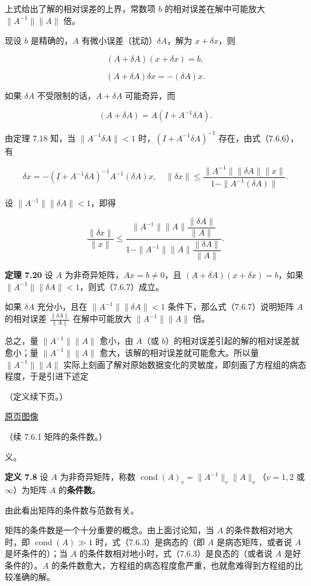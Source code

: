 \documentclass[
  10pt,
  fontset=fandol]{ctexart}
\begin{document}
上式给出了解的相对误差的上界，常数项 \(b\) 的相对误差在解中可能放大 \(\|A^{-1}\|\|A\|\) 倍。

现设 \(b\) 是精确的，\(A\) 有微小误差（扰动）\(\delta A\)，解为 \(x+\delta x\)，则

\[
(A+\delta A)(x+\delta x)=b,
\]

\[
(A+\delta A)\delta x=-(\delta A)x.
\tag{7.6.6}
\]

如果 \(\delta A\) 不受限制的话，\(A+\delta A\) 可能奇异，而

\[
(A+\delta A)=A(I+A^{-1}\delta A).
\]

由定理 7.18 知，当 \(\|A^{-1}\delta A\|<1\) 时，\((I+A^{-1}\delta A)^{-1}\) 存在，由式（7.6.6），有

\[
\delta x=-(I+A^{-1}\delta A)^{-1}A^{-1}(\delta A)x,\quad
\|\delta x\|\leqslant\frac{\|A^{-1}\|\|\delta A\|\|x\|}{1-\|A^{-1}(\delta A)\|}.
\]

设 \(\|A^{-1}\|\|\delta A\|<1\)，即得

\[
\frac{\|\delta x\|}{\|x\|}
\leqslant
\frac{\|A^{-1}\|\|A\|\dfrac{\|\delta A\|}{\|A\|}}
{1-\|A^{-1}\|\|A\|\dfrac{\|\delta A\|}{\|A\|}}.
\tag{7.6.7}
\]

\textbf{定理 7.20} 设 \(A\) 为非奇异矩阵，\(Ax=b\neq0\)，且 \((A+\delta A)(x+\delta x)=b\)，如果 \(\|A^{-1}\|\|\delta A\|<1\)，则式（7.6.7）成立。

如果 \(\delta A\) 充分小，且在 \(\|A^{-1}\|\|\delta A\|<1\) 条件下，那么式（7.6.7）说明矩阵 \(A\) 的相对误差 \(\frac{\|\delta A\|}{\|A\|}\) 在解中可能放大 \(\|A^{-1}\|\|A\|\) 倍。

总之，量 \(\|A^{-1}\|\|A\|\) 愈小，由 \(A\)（或 \(b\)）的相对误差引起的解的相对误差就愈小；量 \(\|A^{-1}\|\|A\|\) 愈大，该解的相对误差就可能愈大。所以量 \(\|A^{-1}\|\|A\|\) 实际上刻画了解对原始数据变化的灵敏度，即刻画了方程组的病态程度，于是引进下述定

（定义续下页。）

\href{../../source-images/pdf-207.jpeg}{原页图像}

（续 7.6.1 矩阵的条件数。）

义。

\textbf{定义 7.8} 设 \(A\) 为非奇异矩阵，称数 \(\operatorname{cond}(A)_v=\|A^{-1}\|_v\|A\|_v\)（\(v=1,2\) 或 \(\infty\)）为矩阵 \(A\) 的\textbf{条件数}。

由此看出矩阵的条件数与范数有关。

矩阵的条件数是一个十分重要的概念。由上面讨论知，当 \(A\) 的条件数相对地大时，即 \(\operatorname{cond}(A)\gg1\) 时，式（7.6.3）是病态的（即 \(A\) 是病态矩阵，或者说 \(A\) 是坏条件的）；当 \(A\) 的条件数相对地小时，式（7.6.3）是良态的（或者说 \(A\) 是好条件的）。\(A\) 的条件数愈大，方程组的病态程度愈严重，也就愈难得到方程组的比较准确的解。
\end{document}
